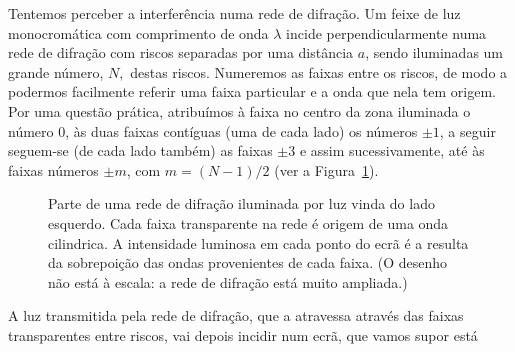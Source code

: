 Tentemos perceber a interferência numa rede de difração. Um feixe de luz
monocromática com comprimento de onda $\lambda$ incide perpendicularmente numa
rede de difração com riscos separadas por uma distância $a$, sendo iluminadas um
grande número, $N,$ destas riscos. Numeremos as faixas entre os riscos, de modo
a podermos facilmente referir uma faixa particular e a onda que nela tem origem.
Por uma questão prática, atribuímos à faixa no centro da zona iluminada o número
0, às duas faixas contíguas (uma de cada lado) os números $\pm1$, a seguir
seguem-se (de cada lado também) as faixas $\pm3$ e assim sucessivamente, até às
faixas números $\pm m$, com $m=(N-1)/2$ (ver a Figura~\ref{fig:grating}).
\begin{figure}[htb]
{\centering
  \par
  }
  \caption{\label{fig:grating}Parte de uma rede de difração iluminada por luz
  vinda do lado esquerdo. Cada faixa transparente na rede é origem de uma onda
  cilindrica. A intensidade luminosa em cada ponto do ecrã é a resulta da
  sobrepoição das ondas provenientes de cada faixa. (O desenho não está à
  escala: a rede de difração está muito ampliada.)}
\end{figure}
A luz transmitida pela rede de difração, que a atravessa através das faixas
transparentes entre riscos, vai depois incidir num ecrã, que vamos supor está
